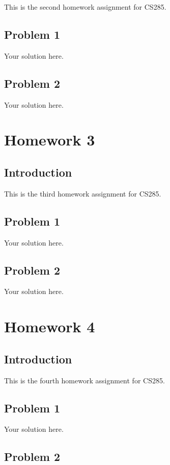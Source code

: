 \documentclass[12pt,oneside]{book}
\begin{document}
This is the second homework assignment for CS285.

\section{Problem 1}

Your solution here.

\section{Problem 2}

Your solution here.

\chapter{Homework 3}

\section{Introduction}

This is the third homework assignment for CS285.

\section{Problem 1}

Your solution here.

\section{Problem 2}

Your solution here.

\chapter{Homework 4}

\section{Introduction}

This is the fourth homework assignment for CS285.

\section{Problem 1}

Your solution here.

\section{Problem 2}
\end{document}
